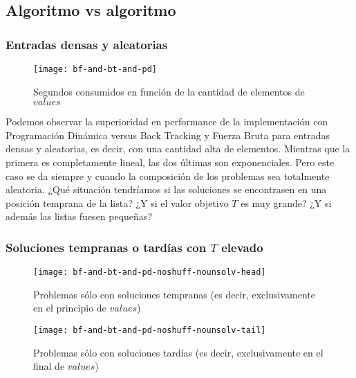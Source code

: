 \subsection{Algoritmo vs algoritmo}
\subsubsection{Entradas densas y aleatorias}
\begin{figure}[H]
	\centering
	\texttt{[image: bf-and-bt-and-pd]}
	\caption{\footnotesize Segundos consumidos en función de la cantidad de elementos de $values$}
	\label{fig:bf-and-bt-and-pd}
\end{figure}

Podemos observar la superioridad en performance de la implementación con Programación Dinámica versus Back Tracking y Fuerza Bruta para entradas densas y aleatorias, es decir, con una cantidad alta de elementos. Mientras que la primera es completamente lineal, las dos últimas son exponenciales. Pero este caso se da siempre y cuando la composición de los problemas sea totalmente aleatoria. ¿Qué situación tendríamos si las soluciones se encontrasen en una posición temprana de la lista? ¿Y si el valor objetivo $T$ es muy grande? ¿Y si además las listas fuesen pequeñas?

\subsubsection{Soluciones tempranas o tardías con $T$ elevado}
\begin{figure}[H]
	\centering
	\begin{minipage}{0.48\textwidth}
		\centering
		\texttt{[image: bf-and-bt-and-pd-noshuff-nounsolv-head]}
		\caption{\footnotesize Problemas sólo con soluciones tempranas (es decir, exclusivamente en el principio de $values$)}
		\label{fig:bf-and-bt-and-pd-noshuff-nounsolv-head}
	\end{minipage}%
	\hspace{0.03\textwidth}
	\begin{minipage}{0.48\textwidth}
		\centering
		\texttt{[image: bf-and-bt-and-pd-noshuff-nounsolv-tail]}
		\caption{\footnotesize Problemas sólo con soluciones tardías (es decir, exclusivamente en el final de $values$)}
		\label{fig:bf-and-bt-and-pd-noshuff-nounsolv-tail}
	\end{minipage}%
\end{figure}

